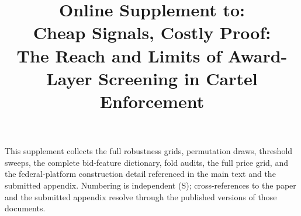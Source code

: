\documentclass[12pt,authoryear]{elsarticle}
\begin{document}
\sloppy
\hfuzz=300pt

\begin{frontmatter}
\title{Online Supplement to:\\
Cheap Signals, Costly Proof:\\
The Reach and Limits of Award-Layer Screening in Cartel Enforcement}
\author{}
\end{frontmatter}

\renewcommand{\thesection}{S\arabic{section}}
\setcounter{section}{0}
\setcounter{table}{0}
\setcounter{figure}{0}
\renewcommand{\thetable}{S\arabic{section}.\arabic{table}}
\renewcommand{\thefigure}{S\arabic{section}.\arabic{figure}}
\makeatletter
{}
\makeatother

\noindent This supplement collects the full robustness grids, permutation
draws, threshold sweeps, the complete bid-feature dictionary, fold audits,
the full price grid, and the federal-platform construction detail referenced
in the main text and the submitted appendix. Numbering is independent
(\textsf{S}); cross-references to the paper and the submitted
appendix resolve through the published versions of those documents.

\end{document}
